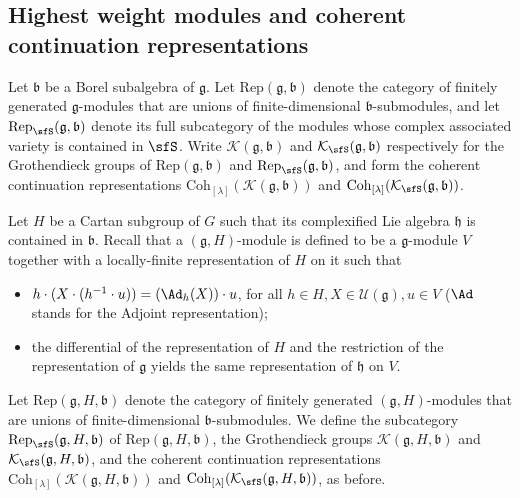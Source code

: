 \documentclass[12pt,a4paper]{amsart}
\newcommand{\CK}{{\mathcal {K}}}
\newcommand{\CU}{{\mathcal {U}}}
\newcommand{\g}{\mathfrak g}
\newcommand{\h}{\mathfrak h}
\renewcommand{\b}{\mathfrak b}
\numberwithin{equation}{section}
\theoremstyle{remark}
\def\Coh{\mathrm{Coh}}
\newcommand{\Lam}{{[\lambda]}}
\begin{document}
\subsection{Highest weight modules and coherent continuation representations}

\newcommand{\Rep}{\mathrm{Rep}}
Let $\b$ be a  Borel subalgebra of $\g$. Let $\Rep(\g,\b)$ denote the category of finitely generated $\g$-modules that are unions of finite-dimensional $\b$-submodules, and  let $\Rep_\sfS(\g,\b)$ denote its full subcategory of the modules whose complex associated variety is contained in $\sfS$.
Write $\CK(\g,\b)$ and $\CK_\sfS(\g,\b)$ respectively for the Grothendieck groups of $\Rep(\g,\b)$  and $\Rep_\sfS(\g,\b)$, and form the   coherent continuation representations $\Coh_{\Lam}(\CK(\g,\b))$ and $\Coh_{\Lam}(\CK_\sfS(\g,\b))$.


    Let $H$ be a Cartan subgroup of $G$ such that its complexified Lie algebra $\h$ is contained in $\b$. Recall that a $(\g, H)$-module is defined to be a $\g$-module $V$ together with a locally-finite representation of $H$ on it such that
     \begin{itemize}
     \item
        $h\cdot (X\cdot (h^{-1}\cdot u))=(\Ad_h(X))\cdot u$, for all $h\in H, X\in \CU(\g), u\in V$ ($\Ad$ stands for the Adjoint representation);
        \item the differential of the representation of $H$ and the restriction of the representation of $\g$ yields the same representation of $\h$ on $V$.
     \end{itemize}

Let $\Rep(\g,H,\b)$ denote the category of finitely generated $(\g, H)$-modules that  are unions of finite-dimensional $\b$-submodules.
We define the subcategory $\Rep_\sfS(\g,H,\b)$ of $\Rep(\g,H,\b)$,  the Grothendieck groups $\CK(\g,H, \b)$ and $\CK_\sfS(\g,H, \b)$, and the coherent continuation representations $\Coh_{\Lam}(\CK(\g,H, \b))$ and  $\Coh_{\Lam}(\CK_\sfS(\g,H, \b))$, as before.
\end{document}
